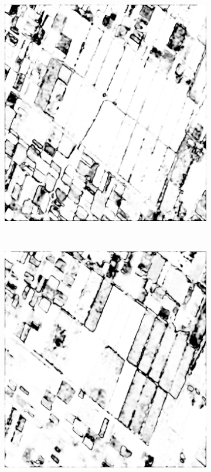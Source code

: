\begin{figure}[tbp]
\begin{subfigure}[b]{0.3\textwidth}
            \includegraphics[width=\textwidth]{Figures/Kron/Conf/LP}
            \caption{}
            \label{fig:CPconf}
        \end{subfigure}
            ~ %
            \begin{subfigure}[b]{0.3\textwidth}
                \includegraphics[width=\textwidth]{Figures/Kron/Conf/CLP}
                \caption{}
                \label{fig:CLPconf}
            \end{subfigure}
          

\end{figure}
